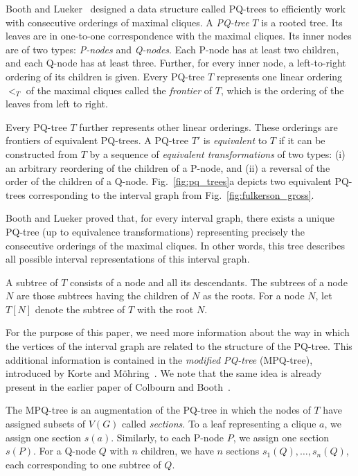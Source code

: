  Booth and Lueker~\cite{PQ_trees} designed a data structure called PQ-trees to
efficiently work with consecutive orderings of maximal cliques. A \emph{PQ-tree} $T$ is a rooted
tree. Its leaves are in one-to-one correspondence with the maximal cliques. Its inner nodes are of
two types: \emph{P-nodes} and \emph{Q-nodes}. Each P-node has at least two children, and each Q-node
has at least three. Further, for every inner node, a left-to-right ordering of its children is
given. Every PQ-tree $T$ represents one linear ordering $<_T$ of the maximal cliques called the
\emph{frontier} of $T$, which is the ordering of the leaves from left to right.

Every PQ-tree $T$ further represents other linear orderings. These orderings are frontiers of
equivalent PQ-trees. A PQ-tree $T'$ is \emph{equivalent} to $T$ if it can be constructed from $T$ by
a sequence of \emph{equivalent transformations} of two types: (i) an arbitrary reordering of the
children of a P-node, and (ii) a reversal of the order of the children of a Q-node.
Fig.~\ref{fig:pq_trees}a depicts two equivalent PQ-trees corresponding to the interval graph from
Fig.~\ref{fig:fulkerson_gross}.

Booth and Lueker proved that, for every interval graph, there exists a unique PQ-tree (up to
equivalence transformations) representing precisely the consecutive orderings of the maximal
cliques. In other words, this tree describes all possible interval representations of this interval
graph. 

A subtree of $T$ consists of a node and all its descendants. The subtrees of a node $N$ are those
subtrees having the children of $N$ as the roots. For a node $N$, let $T[N]$ denote the subtree of
$T$ with the root $N$.

For the purpose of this paper, we need more information about the way in which the vertices of the
interval graph are related to the structure of the PQ-tree. This additional information is contained
in the \emph{modified PQ-tree} (MPQ-tree), introduced by Korte and M\"ohring~\cite{korte_mohring}.
We note that the same idea is already present in the earlier paper of Colbourn and
Booth~\cite{colbourn_booth}.

The MPQ-tree is an augmentation of the PQ-tree in which the nodes of $T$ have assigned subsets of
$V(G)$ called \emph{sections}.  To a leaf representing a clique $a$, we assign one section $s(a)$.
Similarly, to each P-node $P$, we assign one section $s(P)$. For a Q-node $Q$ with $n$ children,
we have $n$ sections $s_1(Q),\dots,s_n(Q)$, each corresponding to one subtree of $Q$.

